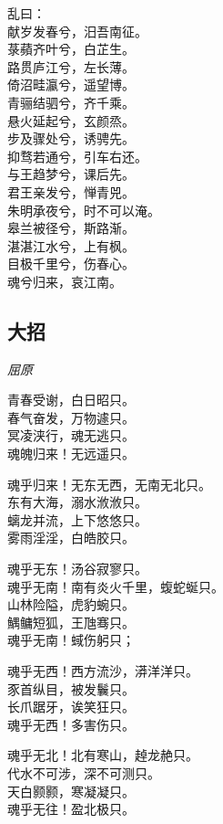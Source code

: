 \documentclass[]{article}
\begin{document}
乱曰：\\
献岁发春兮，汨吾南征。\\
菉蘋齐叶兮，白芷生。\\
路贯庐江兮，左长薄。\\
倚沼畦瀛兮，遥望博。\\
青骊结驷兮，齐千乘。\\
悬火延起兮，玄颜烝。\\
步及骤处兮，诱骋先。\\
抑骛若通兮，引车右还。\\
与王趋梦兮，课后先。\\
君王亲发兮，惮青兕。\\
朱明承夜兮，时不可以淹。\\
皋兰被径兮，斯路渐。\\
湛湛江水兮，上有枫。\\
目极千里兮，伤春心。\\
魂兮归来，哀江南。

\hypertarget{header-n179}{%
\subsection{大招}\label{header-n179}}

\emph{屈原}

青春受谢，白日昭只。\\
春气奋发，万物遽只。\\
冥凌浃行，魂无逃只。\\
魂魄归来！无远遥只。

魂乎归来！无东无西，无南无北只。\\
东有大海，溺水浟浟只。\\
螭龙并流，上下悠悠只。\\
雾雨淫淫，白皓胶只。

魂乎无东！汤谷寂寥只。\\
魂乎无南！南有炎火千里，蝮蛇蜒只。\\
山林险隘，虎豹蜿只。\\
鰅鳙短狐，王虺骞只。\\
魂乎无南！蜮伤躬只；

魂乎无西！西方流沙，漭洋洋只。\\
豕首纵目，被发鬤只。\\
长爪踞牙，诶笑狂只。\\
魂乎无西！多害伤只。

魂乎无北！北有寒山，趠龙赩只。\\
代水不可涉，深不可测只。\\
天白颢颢，寒凝凝只。\\
魂乎无往！盈北极只。
\end{document}
